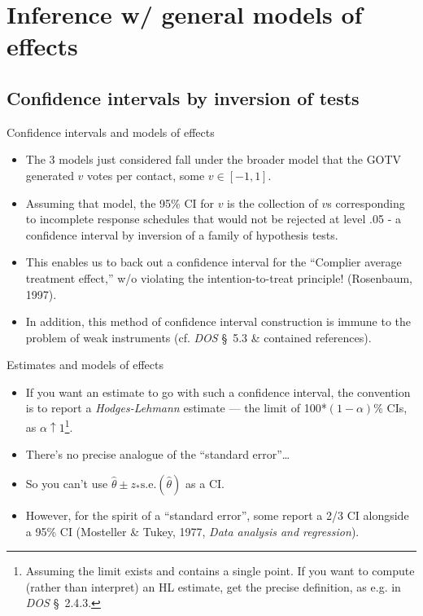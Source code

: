 


\section{Inference w/ general models of effects}

\subsection{Confidence intervals by inversion of tests}
\begin{frame}{Confidence intervals and models of effects}

  \begin{itemize}[<+->]
  \item The 3 models just considered fall under the broader model that the GOTV
generated $v$ votes per contact, some $v \in [-1, 1]$.
\item Assuming that model, the 95\% CI for $v$ is the collection of $v$s corresponding to incomplete response schedules that would not be rejected at level .05 - a confidence interval by inversion of a family of hypothesis tests.
\item This enables us to back out a confidence interval for the
  ``Complier average treatment effect,'' w/o violating the
  intention-to-treat principle! (Rosenbaum, 1997).
\item In addition, this method of confidence interval construction is
  immune to the problem of weak instruments (cf. \textit{DOS} \S~5.3 \&
  contained references).
  \end{itemize}


\end{frame}

\begin{frame}{Estimates and models of effects}
  
  \begin{itemize}
\item If you want an estimate to go with such a confidence interval,
  the convention is to report a \textit{Hodges-Lehmann} estimate ---
  the limit of 100*$(1-\alpha)$\% CIs, as $\alpha \uparrow
  1$\footnote{Assuming the limit exists and contains a single
    point. If you want to compute (rather than interpret) an HL
    estimate, get the precise definition, as e.g. in \textit{DOS} \S~2.4.3. }. 
\item There's no precise analogue of the ``standard error''\ldots
\item So you can't use $\hat{\theta} \pm z_{*}\mathrm{s.e.}(\hat
  \theta)$ as a CI. 
\item However, for the spirit of a ``standard error'', some report a 2/3 CI alongside a 95\% CI  (Mosteller \& Tukey, 1977, \textit{Data analysis and regression}).
  \end{itemize}
\end{frame}
